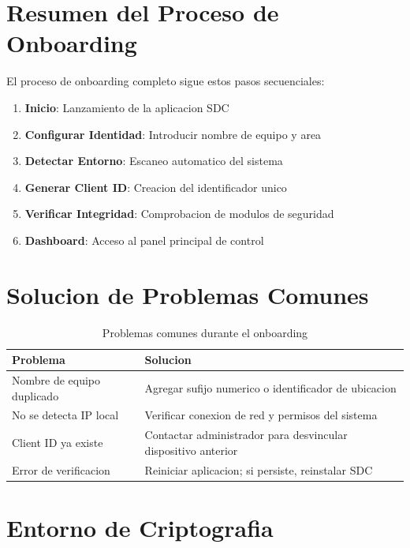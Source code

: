 \section{Resumen del Proceso de Onboarding}

El proceso de onboarding completo sigue estos pasos secuenciales:

\begin{enumerate}
    \item \textbf{Inicio}: Lanzamiento de la aplicacion SDC
    \item \textbf{Configurar Identidad}: Introducir nombre de equipo y area
    \item \textbf{Detectar Entorno}: Escaneo automatico del sistema
    \item \textbf{Generar Client ID}: Creacion del identificador unico
    \item \textbf{Verificar Integridad}: Comprobacion de modulos de seguridad
    \item \textbf{Dashboard}: Acceso al panel principal de control
\end{enumerate}

\section{Solucion de Problemas Comunes}

\begin{table}[H]
\centering
\begin{tabular}{p{5cm}p{8cm}}
\toprule
\textbf{Problema} & \textbf{Solucion} \\
\midrule
Nombre de equipo duplicado & Agregar sufijo numerico o identificador de ubicacion \\
No se detecta IP local & Verificar conexion de red y permisos del sistema \\
Client ID ya existe & Contactar administrador para desvincular dispositivo anterior \\
Error de verificacion & Reiniciar aplicacion; si persiste, reinstalar SDC \\
\bottomrule
\end{tabular}
\caption{Problemas comunes durante el onboarding}
\label{tab:problemas-onboarding}
\end{table}

\section{Entorno de Criptografia}
\label{sec:criptografia}

